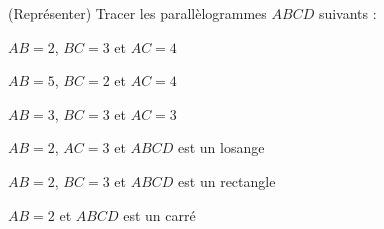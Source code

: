  (Représenter) Tracer les parallèlogrammes $ABCD$ suivants :

\begin{multicols}{2}
  
  $AB=2$, $BC=3$ et $AC=4$

  
  $AB=5$, $BC=2$ et $AC=4$

  
  $AB=3$, $BC=3$ et $AC=3$

  
  $AB=2$, $AC=3$ et $ABCD$ est un losange

  
  $AB=2$, $BC=3$ et $ABCD$ est un rectangle

  
  $AB=2$ et $ABCD$ est un carré
\end{multicols}
